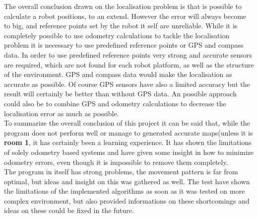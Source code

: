 The overall conclusion drawn on the localisation problem is that is possible to calculate a robot positions, to an extend. However the error will always become to big, and reference points set by the robot it self are unreliable.  While it is completely possible to use odometry calculations to tackle the localisation problem it is necessary to use predefined reference points or GPS and compass data. In order to use predefined reference points very strong and accurate sensors are required, which are not found for each robot platform, as well as the structure of the environment. GPS and compass data would make the localisation as accurate as possible. Of course GPS sensors have also a limited accuracy but the result will certainly be better than without GPS data. An possible approach could also be to combine GPS and odometry calculations to decrease the localisation error as much as possible. \\[3ex]

To summarize the overall conclusion of this project it can be said that, while the program does not perform well or manage to generated accurate maps(unless it is \textbf{room 1}, it has certainly been a learning experience. It has shown the limitations of solely odometry based systems and have given some insight in how to minimize odometry errors, even though it is impossible to remove them completely. \\
The program in itself has strong problems, the movement pattern is far from optimal, but ideas and insight on this was gathered as well. The test have shown the limitations of the implemented algorithms as soon as it was tested on more complex environment, but also provided informations on these shortcomings and ideas on these could be fixed in the future.
